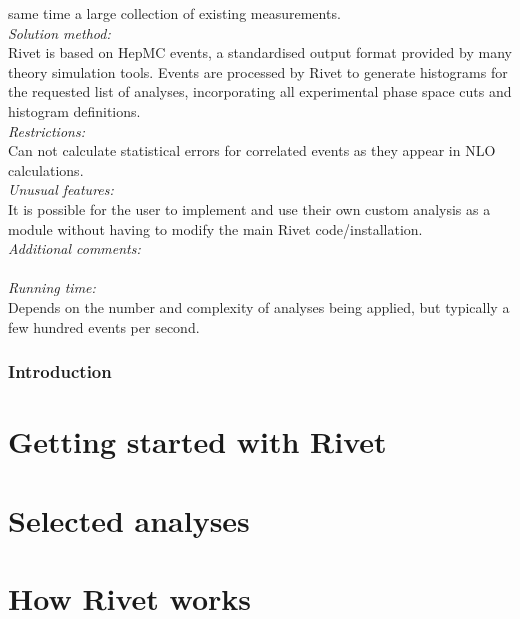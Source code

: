 \documentclass[preprint,12pt]{elsarticle}
\begin{document}
\begin{small}
  same time a large collection of existing measurements.
  \\
  {\em Solution method:}\\
  Rivet is based on HepMC events, a standardised output format provided by many
  theory simulation tools. Events are processed by Rivet to generate histograms
  for the requested list of analyses, incorporating all experimental phase
  space cuts and histogram definitions.
  \\
  {\em Restrictions:}\\
  Can not calculate statistical errors for correlated events as they appear
  in NLO calculations.
  \\
  {\em Unusual features:}\\
  It is possible for the user to implement and use their own custom analysis
  as a module without having to modify the main Rivet code/installation.
  \\
  {\em Additional comments:}\\
  \\
  {\em Running time:}\\
  Depends on the number and complexity of analyses being applied, but typically
  a few hundred events per second.
  \\

\end{small}


\section{Introduction}
\label{sec:intro}


\cleardoublepage

\part{Getting started with Rivet}
\label{part:gettingstarted}


\cleardoublepage

\part{Selected analyses}
\label{part:selectedanalyses}


\cleardoublepage

\part{How Rivet works}
\label{part:writinganalyses}

\end{document}
